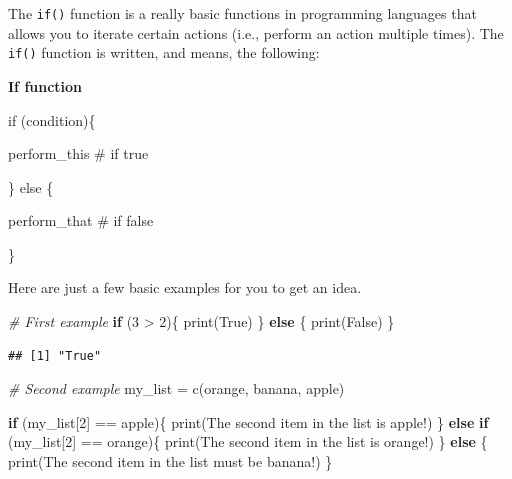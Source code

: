 \documentclass[
]{book}
\newenvironment{Shaded}{\begin{snugshade}}{\end{snugshade}}
\newcommand{\CommentTok}[1]{\textcolor[rgb]{0.56,0.35,0.01}{\textit{#1}}}
\newcommand{\ControlFlowTok}[1]{\textcolor[rgb]{0.13,0.29,0.53}{\textbf{#1}}}
\newcommand{\DecValTok}[1]{\textcolor[rgb]{0.00,0.00,0.81}{#1}}
\newcommand{\FunctionTok}[1]{\textcolor[rgb]{0.00,0.00,0.00}{#1}}
\newcommand{\NormalTok}[1]{#1}
\newcommand{\OtherTok}[1]{\textcolor[rgb]{0.56,0.35,0.01}{#1}}
\newcommand{\SpecialCharTok}[1]{\textcolor[rgb]{0.00,0.00,0.00}{#1}}
\newcommand{\StringTok}[1]{\textcolor[rgb]{0.31,0.60,0.02}{#1}}
\begin{document}
The \texttt{if()} function is a really basic functions in programming languages that allows you to iterate certain actions (i.e., perform an action multiple times).
The \texttt{if()} function is written, and means, the following:

\textbf{If function}

if (condition)\{

perform\_this \# if true

\} else \{

perform\_that \# if false

\}

Here are just a few basic examples for you to get an idea.

\begin{Shaded}
\begin{Highlighting}[]
\CommentTok{\# First example}
\ControlFlowTok{if}\NormalTok{ (}\DecValTok{3} \SpecialCharTok{\textgreater{}} \DecValTok{2}\NormalTok{)\{}
  \FunctionTok{print}\NormalTok{(}\StringTok{\textquotesingle{}True\textquotesingle{}}\NormalTok{)}
\NormalTok{\} }\ControlFlowTok{else}\NormalTok{ \{}
  \FunctionTok{print}\NormalTok{(}\StringTok{\textquotesingle{}False\textquotesingle{}}\NormalTok{)}
\NormalTok{\}}
\end{Highlighting}
\end{Shaded}

\begin{verbatim}
## [1] "True"
\end{verbatim}

\begin{Shaded}
\begin{Highlighting}[]
\CommentTok{\# Second example}
\NormalTok{my\_list }\OtherTok{=} \FunctionTok{c}\NormalTok{(}\StringTok{\textquotesingle{}orange\textquotesingle{}}\NormalTok{, }\StringTok{\textquotesingle{}banana\textquotesingle{}}\NormalTok{, }\StringTok{\textquotesingle{}apple\textquotesingle{}}\NormalTok{)}

\ControlFlowTok{if}\NormalTok{ (my\_list[}\DecValTok{2}\NormalTok{] }\SpecialCharTok{==} \StringTok{\textquotesingle{}apple\textquotesingle{}}\NormalTok{)\{}
  \FunctionTok{print}\NormalTok{(}\StringTok{\textquotesingle{}The second item in the list is apple!\textquotesingle{}}\NormalTok{)}
\NormalTok{\} }\ControlFlowTok{else} \ControlFlowTok{if}\NormalTok{ (my\_list[}\DecValTok{2}\NormalTok{] }\SpecialCharTok{==} \StringTok{\textquotesingle{}orange\textquotesingle{}}\NormalTok{)\{}
  \FunctionTok{print}\NormalTok{(}\StringTok{\textquotesingle{}The second item in the list is orange!\textquotesingle{}}\NormalTok{)}
\NormalTok{\} }\ControlFlowTok{else}\NormalTok{ \{}
  \FunctionTok{print}\NormalTok{(}\StringTok{\textquotesingle{}The second item in the list must be banana!\textquotesingle{}}\NormalTok{)}
\NormalTok{\}}
\end{Highlighting}
\end{Shaded}
\end{document}
